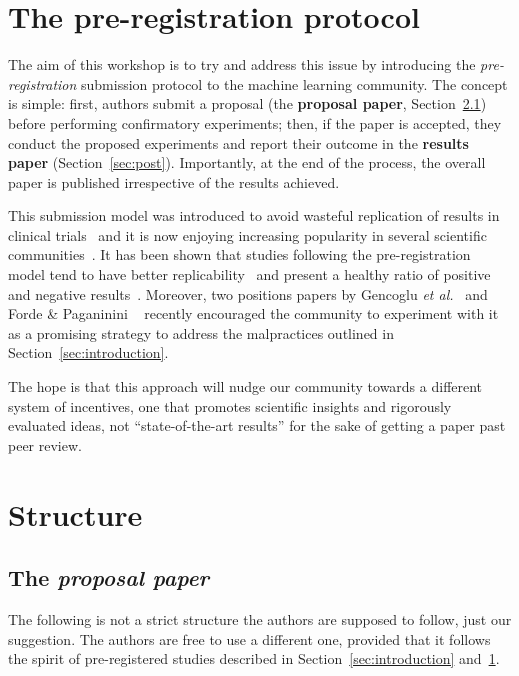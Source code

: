 \documentclass{article}
\begin{document}
\section{The pre-registration protocol}
\label{sec:preregistration}
The aim of this workshop is to
try and address this issue by introducing the \emph{pre-registration} submission protocol to the machine learning community.
The concept is simple: first, authors submit a proposal (the \textbf{proposal paper}, Section~\ref{sec:structure}) before performing confirmatory experiments; then, if the paper is accepted, they conduct the proposed experiments and report their outcome in the \textbf{results paper} (Section~\ref{sec:post}).
Importantly, at the end of the process, the overall paper is published irrespective of the results achieved.

This submission model was introduced to avoid wasteful replication of results in clinical trials~\cite{dickersin2003registering} and it is now enjoying increasing popularity in several scientific communities~\cite{nosek2018preregistration}.
It has been shown that studies following the pre-registration model tend to have better replicability~\cite{swaen2001false} and present a healthy ratio of positive and negative results~\cite{irvin2015likelihood}.
Moreover, two positions papers by Gencoglu \emph{et al.}~\cite{gencoglu2019hark} and Forde \& Paganinini ~\cite{forde2019scientific} recently encouraged the community to experiment with it as a promising strategy to address the malpractices outlined in Section~\ref{sec:introduction}.

The hope is that this approach will nudge our community towards a different system of incentives, one that promotes scientific insights and rigorously evaluated ideas, not ``state-of-the-art results'' for the sake of getting a paper past peer review.

\section{Structure}
\subsection{The \emph{proposal paper}}
\label{sec:structure}
The following is not a strict structure the authors are supposed to follow, just our suggestion.
The authors are free to use a different one, provided that it follows the spirit of pre-registered studies described in Section~\ref{sec:introduction} and~\ref{sec:preregistration}.
\end{document}
